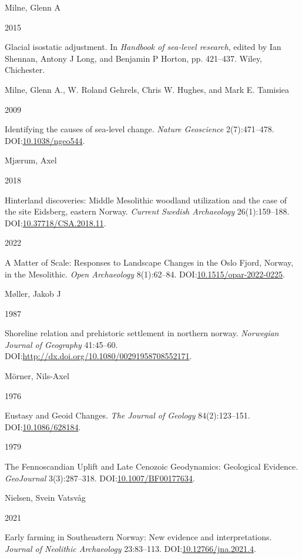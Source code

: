 \documentclass[
]{article}
\newlength{\cslhangindent}
\newlength{\csllabelwidth}
\newlength{\cslentryspacingunit} %
\newenvironment{CSLReferences}[2] %
 {%
  \setlength{\parindent}{0pt}
  \ifodd #1
  \let\oldpar\par
  \def\par{\hangindent=\cslhangindent\oldpar}
  \fi
  \setlength{\parskip}{#2\cslentryspacingunit}
 }%
 {}
\newcommand{\CSLBlock}[1]{#1\hfill\break}
\newcommand{\CSLLeftMargin}[1]{\parbox[t]{\csllabelwidth}{#1}}
\newcommand{\CSLRightInline}[1]{\parbox[t]{\linewidth - \csllabelwidth}{#1}\break}
\begin{document}
\begin{CSLReferences}{0}{0}
\leavevmode{}%
\CSLBlock{Milne, Glenn A}
\CSLLeftMargin{ 2015}
\CSLRightInline{Glacial isostatic adjustment. In \emph{Handbook of sea-level research}, edited by Ian Shennan, Antony J Long, and Benjamin P Horton, pp. 421--437. Wiley, Chichester.}

\leavevmode{}%
\CSLBlock{Milne, Glenn A., W. Roland Gehrels, Chris W. Hughes, and Mark E. Tamisiea}
\CSLLeftMargin{ 2009}
\CSLRightInline{Identifying the causes of sea-level change. \emph{Nature Geoscience} 2(7):471--478. DOI:\href{https://doi.org/10.1038/ngeo544}{10.1038/ngeo544}.}

\leavevmode{}%
\CSLBlock{Mjærum, Axel}
\CSLLeftMargin{ 2018}
\CSLRightInline{Hinterland discoveries: Middle Mesolithic woodland utilization and the case of the site Eidsberg, eastern Norway. \emph{Current Swedish Archaeology} 26(1):159--188. DOI:\href{https://doi.org/10.37718/CSA.2018.11}{10.37718/CSA.2018.11}.}

\leavevmode{}%
\CSLLeftMargin{ 2022 }
\CSLRightInline{{A Matter of Scale: Responses to Landscape Changes in the Oslo Fjord, Norway, in the Mesolithic}. \emph{Open Archaeology} 8(1):62--84. DOI:\href{https://doi.org/10.1515/opar-2022-0225}{10.1515/opar-2022-0225}.}

\leavevmode{}%
\CSLBlock{Møller, Jakob J}
\CSLLeftMargin{ 1987}
\CSLRightInline{Shoreline relation and prehistoric settlement in northern norway. \emph{Norwegian Journal of Geography} 41:45--60. DOI:\url{http://dx.doi.org/10.1080/00291958708552171}.}

\leavevmode{}%
\CSLBlock{Mörner, Nils-Axel}
\CSLLeftMargin{ 1976}
\CSLRightInline{{Eustasy and Geoid Changes}. \emph{The Journal of Geology} 84(2):123--151. DOI:\href{https://doi.org/10.1086/628184}{10.1086/628184}.}

\leavevmode{}%
\CSLLeftMargin{ 1979 }
\CSLRightInline{{The Fennoscandian Uplift and Late Cenozoic Geodynamics: Geological Evidence}. \emph{GeoJournal} 3(3):287--318. DOI:\href{https://doi.org/10.1007/BF00177634}{10.1007/BF00177634}.}

\leavevmode{}%
\CSLBlock{Nielsen, Svein Vatsvåg}
\CSLLeftMargin{ 2021}
\CSLRightInline{Early farming in Southeastern Norway: New evidence and interpretations. \emph{Journal of Neolithic Archaeology} 23:83--113. DOI:\href{https://doi.org/10.12766/jna.2021.4}{10.12766/jna.2021.4}.}


\end{CSLReferences}
\end{document}
